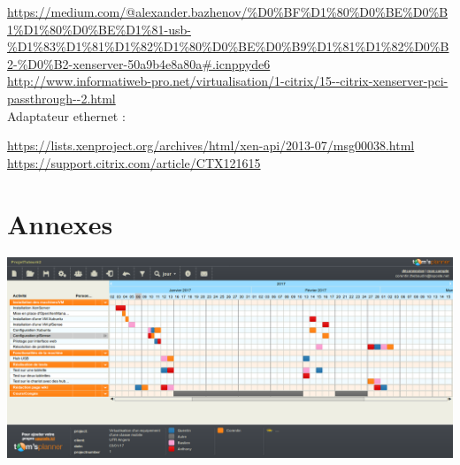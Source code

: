 \documentclass[a4paper,12pt]{extarticle}
\begin{document}
\url{https://medium.com/@alexander.bazhenov/\%D0\%BF\%D1\%80\%D0\%BE\%D0\%B1\%D1\%80\%D0\%BE\%D1\%81-usb-\%D1\%83\%D1\%81\%D1\%82\%D1\%80\%D0\%BE\%D0\%B9\%D1\%81\%D1\%82\%D0\%B2-\%D0\%B2-xenserver-50a9b4e8a80a#.icnppyde6}\\
\url{http://www.informatiweb-pro.net/virtualisation/1-citrix/15--citrix-xenserver-pci-passthrough--2.html}\\

Adaptateur ethernet :

\url{https://lists.xenproject.org/archives/html/xen-api/2013-07/msg00038.html}\\
\url{https://support.citrix.com/article/CTX121615}\\

\clearpage

\section{Annexes}

\begin{center}
\includegraphics[scale=0.70, angle=270]{Gantt2}
\end{center}
\end{document}
